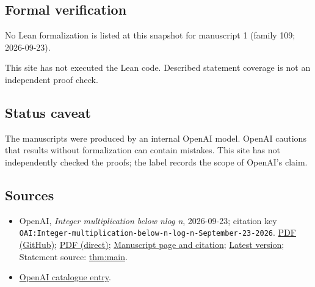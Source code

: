 \documentclass[11pt]{article}
\begin{document}
\subsection{Formal verification}
No Lean formalization is listed at this snapshot for manuscript 1 (family 109; 2026-09-23).

This site has not executed the Lean code. Described statement coverage is not an independent proof check.

\subsection{Status caveat}
The manuscripts were produced by an internal OpenAI model. OpenAI cautions that results without formalization can contain mistakes. This site has not independently checked the proofs; the label records the scope of OpenAI's claim.

\subsection{Sources}
\begin{itemize}
\item OpenAI, \emph{Integer multiplication below nlog n}, 2026-09-23; citation key \texttt{OAI:Integer-multiplication-below-n-log-n-September-23-2026}. \href{https://github.com/openai/math/blob/adc7f1241b42e322a6451854ab7e4b4c146bf78a/preprints/Integer-multiplication-below-n-log-n-September-23-2026/paper.pdf}{PDF (GitHub)}; \href{https://github.com/openai/math/raw/adc7f1241b42e322a6451854ab7e4b4c146bf78a/preprints/Integer-multiplication-below-n-log-n-September-23-2026/paper.pdf}{PDF (direct)}; \href{https://github.com/openai/math/blob/adc7f1241b42e322a6451854ab7e4b4c146bf78a/preprints/Integer-multiplication-below-n-log-n-September-23-2026/README.md}{Manuscript page and citation}; \href{https://github.com/openai/math/blob/main/preprints/Integer-multiplication-below-n-log-n-September-23-2026/paper.pdf}{Latest version}; Statement source: \href{https://github.com/openai/math/blob/adc7f1241b42e322a6451854ab7e4b4c146bf78a/preprints/Integer-multiplication-below-n-log-n-September-23-2026/build/sections/00-introduction.tex\#L21}{thm:main}.
\item \href{https://github.com/openai/math/blob/adc7f1241b42e322a6451854ab7e4b4c146bf78a/CONTENTS.md}{OpenAI catalogue entry}.
\end{itemize}
\end{document}

